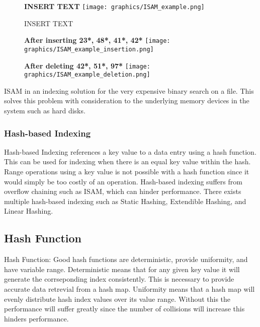 \documentclass[letterpaper, 12pt]{article}
\begin{document}
\begin{figure}
  \centering
  \textbf{INSERT TEXT}
  \texttt{[image: graphics/ISAM\_example.png]}
  \caption{INSERT TEXT}
\end{figure}

\begin{figure}
  \centering
  \textbf{After inserting 23*, 48*, 41*, 42*}
  \texttt{[image: graphics/ISAM\_example\_insertion.png]}
\end{figure}

\begin{figure}
  \centering
  \textbf{After deleting 42*, 51*, 97*}
  \texttt{[image: graphics/ISAM\_example\_deletion.png]}
\end{figure}

\par\vspace{\baselineskip}

ISAM in an indexing solution for the very expensive binary search on a file. This solves this 
problem with consideration to the underlying memory devices in the system such as hard disks.

\subsubsection{Hash-based Indexing}
Hash-based Indexing references a key value to a data entry using a hash function. This can be 
used for indexing when there is an equal key value within the hash. Range operations using 
a key value is not possible with a hash function since it would simply be too costly of an 
operation. Hash-based indexing suffers from overflow chaining such as ISAM, which can hinder 
performance. There exists multiple hash-based indexing such as Static Hashing, Extendible Hashing, 
and Linear Hashing. 
\subsection{Hash Function}
Hash Function:
Good hash functions are deterministic, provide uniformity, and have variable range. Deterministic means 
that for any given key value it will generate the corrseponding index consistently. This is 
necessary to provide accurate data retrevial from a hash map. Uniformity means that a hash 
map will evenly distribute hash index values over its value range. Without this the 
performance will suffer greatly since the number of collisions will increase this hinders performance. 
\end{document}
